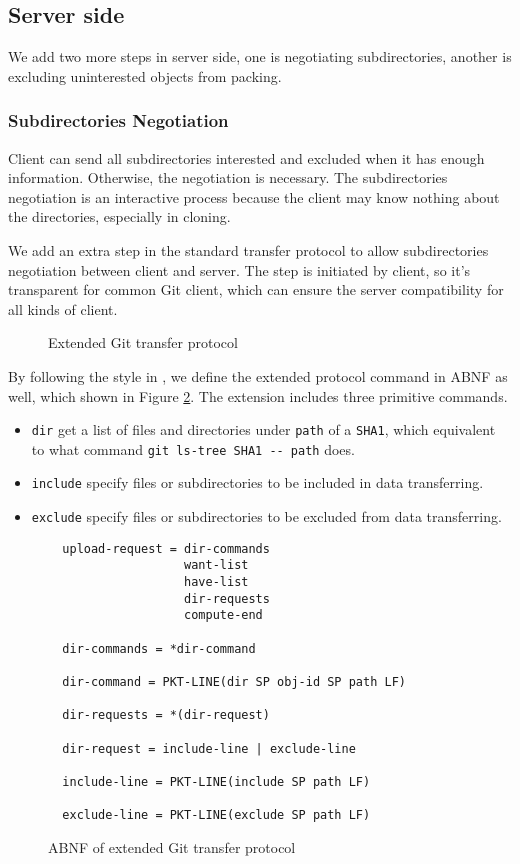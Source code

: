 \documentclass[preprint]{sigplanconf}
\begin{document}
\subsection{Server side}
We add two more steps in server side, one is negotiating subdirectories,
another is excluding uninterested objects from packing.
\subsubsection{Subdirectories Negotiation}
Client can send all subdirectories interested and excluded when it has enough
information.
Otherwise, the negotiation is necessary.
The subdirectories negotiation is an interactive process because the client may
know nothing about the directories, especially in cloning.

We add an extra step in the standard transfer protocol to allow subdirectories
negotiation between client and server.
The step is initiated by client, so it's transparent for common Git client,
which can ensure the server compatibility for all kinds of client.
\begin{figure}[htpb]
  \centering
  
  \caption{Extended Git transfer protocol}
  \label{fig:git-proto-ext-seq}
\end{figure}

By following the style in \cite{tran-protocol}, we define the extended
protocol command in ABNF as well, which shown in Figure
\ref{fig:git-proto-ext-ABNF}.
The extension includes three primitive commands.
\begin{itemize}
  \item \verb|dir| get a list of files and directories under \verb|path| of a
    \verb|SHA1|, which equivalent to what command
    \verb|git ls-tree SHA1 -- path| does.
  \item \verb|include| specify files or subdirectories to be included in data
    transferring.
  \item \verb|exclude| specify files or subdirectories to be excluded from data
    transferring.
\end{itemize}

\begin{figure}[htpb]
  \centering
  \begin{verbatim}
  upload-request = dir-commands
                   want-list
                   have-list
                   dir-requests
                   compute-end

  dir-commands = *dir-command

  dir-command = PKT-LINE(dir SP obj-id SP path LF)

  dir-requests = *(dir-request)

  dir-request = include-line | exclude-line

  include-line = PKT-LINE(include SP path LF)

  exclude-line = PKT-LINE(exclude SP path LF)
  \end{verbatim}
  \caption{ABNF of extended Git transfer protocol}
  \label{fig:git-proto-ext-ABNF}
\end{figure}
\end{document}
